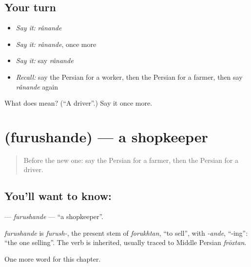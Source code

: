 \subsection*{Your turn}
\begin{itemize}
\raggedright
  \item \emph{Say it:} \emph{rânande}
  \item \emph{Say it:} \emph{rânande}, once more
  \item \emph{Say it:} say \emph{rânande}
  \item \emph{Recall:} say the Persian for a worker, then the Persian for a farmer, then say \emph{rânande} again
\end{itemize}

\begin{tcolorbox}[breakable,colback=teal!4,colframe=teal!35!black,title={Before you move on}]
What does  mean? (\textquotedblleft{}A driver\textquotedblright{}.) Say it once more.
\end{tcolorbox}
\section[\texorpdfstring{\fa{فروشنده} (furushande)}{فروشنده (furushande)}]{ (furushande) — a shopkeeper}

\label{lesson:FA-C116-furushande}



\begin{quote}
Before the new one: say the Persian for a farmer, then the Persian for a driver.
\end{quote}

\subsection*{You'll want to know: }
\textbf{} — \emph{furushande} — \textquotedblleft{}a shopkeeper\textquotedblright{}.

\begin{cousinweb}
\emph{furushande} is \emph{furush-}, the present stem of \emph{forukhtan}, \textquotedblleft{}to sell\textquotedblright{}, with \emph{-ande}, \textquotedblleft{}-ing\textquotedblright{}: \textquotedblleft{}the one selling\textquotedblright{}. The verb is inherited, usually traced to Middle Persian \emph{frōxtan}.
\end{cousinweb}

\begin{grammarlens}[title={What you've built}]
One more word for this chapter.
\end{grammarlens}

